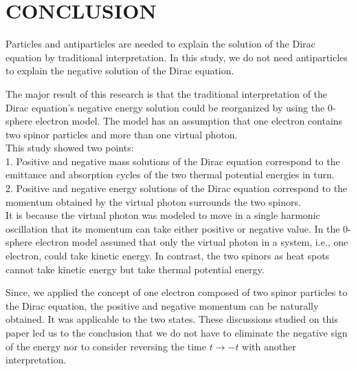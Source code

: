 \documentclass[%
 reprint,
 amsmath,amssymb,
 aps,
]{revtex4-1}
\numberwithin{equation}{section}%
\begin{document}
\section{\label{sec:CONCLUSION}CONCLUSION}

    Particles and antiparticles are needed to explain the solution of the Dirac equation by traditional interpretation. In this study, we do not need antiparticles to explain the negative solution of the Dirac equation.

    The major result of this research is that the traditional interpretation of the Dirac equation's negative energy solution could be reorganized by using the 0-sphere electron model. The model has an assumption that one electron contains two spinor particles and more than one virtual photon. \\
    
    This study showed two points: \\
    
    1. Positive and negative mass solutions of the Dirac equation correspond to the emittance and absorption cycles of the two thermal potential energies in turn. \\

    2. Positive and negative energy solutions of the Dirac equation correspond to the momentum obtained by the virtual photon surrounds the two spinors. \\

    It is because the virtual photon was modeled to move in a single harmonic oscillation that its momentum can take either positive or negative value. In the 0-sphere electron model assumed that only the virtual photon in a system, i.e., one electron, could take kinetic energy. In contrast, the two spinors as heat spots cannot take kinetic energy but take thermal potential energy.

    Since, we applied the concept of one electron composed of two spinor particles to the Dirac equation, the positive and negative momentum can be naturally obtained. It was applicable to the two states. These discussions studied on this paper led us to the conclusion that we do not have to eliminate the negative sign of the energy nor to consider reversing the time $ t \rightarrow - t$ with another interpretation.
\end{document}
